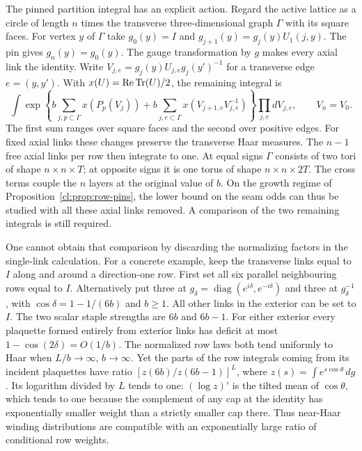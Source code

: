 The pinned partition integral has an explicit action. Regard the active
lattice as a circle of length $n$ times the transverse three-dimensional
graph $\Gamma$ with its square faces. For vertex $y$ of $\Gamma$ take
$g_0(y)=I$ and $g_{j+1}(y)=g_j(y)U_1(j,y)$. The pin gives
$g_n(y)=g_0(y)$. The gauge transformation by $g$ makes every axial link
the identity. Write $V_{j,e}=g_j(y)U_{j,e}g_j(y')^{-1}$ for a transverse
edge $e=(y,y')$. With $x(U)=\operatorname{Re}\operatorname{Tr}(U)/2$, the remaining integral is
\[
 \int\exp\!\left\{b\sum_{j,p\subset\Gamma}x(P_p(V_j))
       +b\sum_{j,e\subset\Gamma}x(V_{j+1,e}V_{j,e}^{-1})\right\}
       \prod_{j,e}dV_{j,e},\qquad V_n=V_0 .
\]
The first sum ranges over square faces and the second over positive
edges. For fixed axial links these changes preserve the transverse
Haar measures. The $n-1$ free axial links per row then integrate to one.
At equal signs $\Gamma$ consists of two tori of shape $n\times n\times T$;
at opposite signs it is one torus of shape $n\times n\times2T$.
The cross terms couple the $n$ layers at the original value of $b$.
On the growth regime of Proposition~\ref{cl:prop:row-pins}, the lower
bound on the seam odds can thus be studied with all these axial links
removed. A comparison of the two remaining integrals is still required.

One cannot obtain that comparison by discarding the normalizing factors
in the single-link calculation. For a concrete example, keep the
transverse links equal to $I$ along and around a direction-one row.
First set all six parallel neighbouring rows equal to $I$. Alternatively
put three at $g_\delta=\operatorname{diag}(e^{i\delta},e^{-i\delta})$
and three at $g_\delta^{-1}$, with $\cos\delta=1-1/(6b)$ and $b\ge1$.
All other links in the exterior can be set to $I$. The two scalar
staple strengths are $6b$ and $6b-1$. For either exterior every plaquette
formed entirely from exterior links has deficit at most
$1-\cos(2\delta)=O(1/b)$. The normalized row laws both tend uniformly
to Haar when $L/b\to\infty$, $b\to\infty$. Yet the parts of the row
integrals coming from its incident plaquettes have ratio
$[z(6b)/z(6b-1)]^L$, where $z(s)=\int e^{s\cos\theta}\,dg$.
Its logarithm divided by $L$ tends to one: $(\log z)'$ is the tilted
mean of $\cos\theta$, which tends to one because the complement of
any cap at the identity has exponentially smaller weight than a
strictly smaller cap there. Thus near-Haar winding distributions are
compatible with an exponentially large ratio of conditional row weights.

